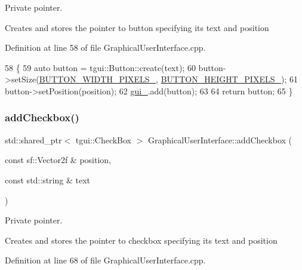 Private pointer. 

Creates and stores the pointer to button specifying its text and position 

Definition at line 58 of file Graphical\+User\+Interface.\+cpp.


\begin{DoxyCode}
58                                                                                                            
        \{
59     \textcolor{keyword}{auto} button = tgui::Button::create(text);
60     button->setSize(\hyperlink{classGraphicalUserInterface_a90c125308f85a684fa6e609d474f4550}{BUTTON\_WIDTH\_PIXELS\_}, 
      \hyperlink{classGraphicalUserInterface_a16c6d010f7594c76c3d4b50f7cb4764b}{BUTTON\_HEIGHT\_PIXELS\_});
61     button->setPosition(position);
62     \hyperlink{classGraphicalUserInterface_ab07abda0fdb8e2965b70d2024fa3cf20}{gui\_}.add(button);
63 
64     \textcolor{keywordflow}{return} button;
65 \}
\end{DoxyCode}
\mbox{\label{classGraphicalUserInterface_ac7094ec5d8ec8edd7325072f97f8de59}} 
\subsubsection{\texorpdfstring{add\+Checkbox()}{addCheckbox()}}
{\footnotesize\ttfamily std\+::shared\+\_\+ptr$<$ tgui\+::\+Check\+Box $>$ Graphical\+User\+Interface\+::add\+Checkbox (\begin{DoxyParamCaption}\item[{const sf\+::\+Vector2f \&}]{position,  }\item[{const std\+::string \&}]{text }\end{DoxyParamCaption})\hspace{0.3cm}{\ttfamily [private]}}



Private pointer. 

Creates and stores the pointer to checkbox specifying its text and position 

Definition at line 68 of file Graphical\+User\+Interface.\+cpp.


